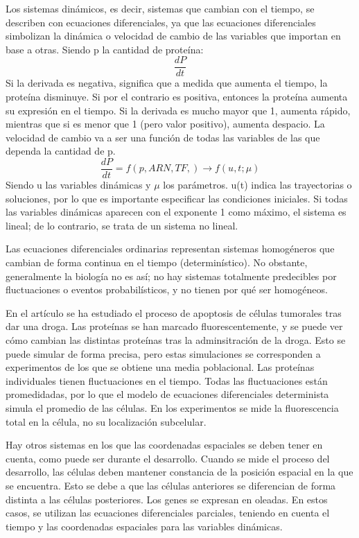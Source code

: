 Los sistemas dinámicos, es decir, sistemas que cambian con el tiempo, se describen con ecuaciones diferenciales, ya que las ecuaciones diferenciales simbolizan la dinámica o velocidad de cambio de las variables que importan en base a otras. Siendo p la cantidad de proteína:
$$\frac{dP}{dt}$$
Si la derivada es negativa, significa que a medida que aumenta el tiempo, la proteína disminuye. Si por el contrario es positiva, entonces la proteína aumenta su expresión en el tiempo. Si la derivada es mucho mayor que 1, aumenta rápido, mientras que si es menor que 1 (pero valor positivo), aumenta despacio. La velocidad de cambio va a ser una función de todas las variables de las que dependa la cantidad de p.
$$\frac{dP}{dt} = f(p, ARN, TF,) \rightarrow f(u, t; \mu)$$
Siendo u las variables dinámicas y $\mu$ los parámetros. u(t) indica las trayectorias o soluciones, por lo que es importante especificar las condiciones iniciales.
Si todas las variables dinámicas aparecen con el exponente 1 como máximo, el sistema es lineal; de lo contrario, se trata de un sistema no lineal.

Las ecuaciones diferenciales ordinarias representan sistemas homogéneros que cambian de forma continua en el tiempo (determinístico). No obstante, generalmente la biología no es así; no hay sistemas totalmente predecibles por fluctuaciones o eventos probabilísticos, y no tienen por qué ser homogéneos. 

En el artículo se ha estudiado el proceso de apoptosis de células tumorales tras dar una droga. Las proteínas se han marcado fluorescentemente, y se puede ver cómo cambian las distintas proteínas tras la adminsitración de la droga. Esto se puede simular de forma precisa, pero estas simulaciones se corresponden a experimentos de los que se obtiene una media poblacional. Las proteínas individuales tienen fluctuaciones en el tiempo. Todas las fluctuaciones están promedidadas, por lo que el modelo de ecuaciones diferenciales determinista simula el promedio de las células. En los experimentos se mide la fluorescencia total en la célula, no su localización subcelular.

Hay otros sistemas en los que las coordenadas espaciales se deben tener en cuenta, como puede ser durante el desarrollo. Cuando se mide el proceso del desarrollo, las células deben mantener constancia de la posición espacial en la que se encuentra. Esto se debe a que las células anteriores se diferencian de forma distinta a las células posteriores. Los genes se expresan en oleadas. En estos casos, se utilizan las ecuaciones diferenciales parciales, teniendo en cuenta el tiempo y las coordenadas espaciales para las variables dinámicas. 

